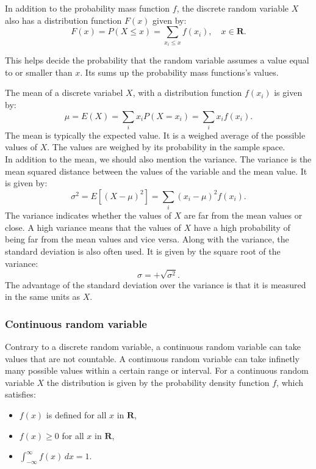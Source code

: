 	In addition to the probability mass function $f$, the discrete random variable $X$ also has a distribution function $F(x)$ given by:
	$$F(x) = P(X \leq x) = \sum_{x_i \leq x} f(x_i), \quad x \in \textbf{R}.$$
	
	This helps decide the probability that the random variable assumes a value equal to or smaller than $x$. Its sums up the probability mass functions's values.
	\newline
	
	The mean of a discrete variabel $X$, with a distribution function $f(x_{i})$ is given by:
	$$\mu = E(X) = \sum_i x_i P(X = x_i) = \sum_i x_i f(x_i).$$
	The mean is typically the expected value. It is a weighed average of the possible values of $X$. The values are weighed by its probability in the sample space.
	\\
	 
	 In addition to the mean, we should also mention the variance. The variance is the mean squared distance between the values of the variable and the mean value. It is given by:
	 $$\sigma^2 = E\left[(X - \mu)^2\right] = \sum_{i} (x_i - \mu)^2 f(x_i).$$
	 The variance indicates whether the values of $X$ are far from the mean values or close. A high variance means that the values of $X$ have a high probability of being far from the mean values and vice versa. Along with the variance, the standard deviation is also often used. It is given by the square root of the variance:
	 $$\sigma=+\sqrt{\sigma^2}.$$
	 The advantage of the standard deviation over the variance is that it is measured in the same units as $X$.
	 
	\subsubsection{Continuous random variable}
	Contrary to a discrete random variable, a continuous random variable can take values that are not countable. A continuous random variable can take infinetly many possible values within a certain range or interval. For a continuous random variable $X$ the distribution is given by the probability density function $f$, which satisfies:
	
	\begin{itemize}
		\item $f(x)$ is defined for all $x$ in $\textbf{R}$,
		\item $f(x) \geq 0$ for all $x$ in $\textbf{R}$,
		\item $\int_{-\infty}^{\infty} f(x) \, dx = 1.$
	\end{itemize}
	
